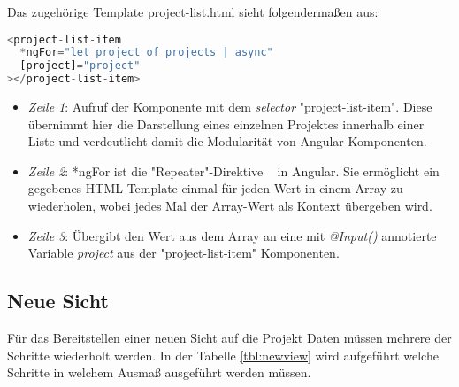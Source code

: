 Das zugehörige Template project-list.html sieht folgendermaßen aus:

\begin{lstlisting}[language=JavaScript,float=h!,caption={Funktion zum Abruf aller Projekte vom Server}, label={lst:example:service}]
<project-list-item
  *ngFor="let project of projects | async"
  [project]="project"
></project-list-item>
\end{lstlisting}

\begin{itemize}
    \setlength\itemsep{-1em}
    \item \emph{Zeile 1}: Aufruf der Komponente mit dem \emph{selector} "project-list-item".
    Diese übernimmt hier die Darstellung eines einzelnen Projektes innerhalb einer Liste und verdeutlicht damit
    die Modularität von Angular Komponenten.
    \item \emph{Zeile 2}: *ngFor ist die "Repeater"-Direktive ~\cite{ng-for} in Angular.
    Sie ermöglicht ein gegebenes HTML Template einmal für jeden Wert in einem Array zu wiederholen,
    wobei jedes Mal der Array-Wert als Kontext übergeben wird.
    \item \emph{Zeile 3}: Übergibt den Wert aus dem Array an eine mit \emph{@Input()} annotierte Variable \emph{project} aus der "project-list-item" Komponenten.
\end{itemize}

\subsection{Neue Sicht}
\label{sec:requirements:example:newview}

Für das Bereitstellen einer neuen Sicht auf die Projekt Daten müssen mehrere der Schritte wiederholt werden.
In der Tabelle \ref{tbl:newview} wird aufgeführt welche Schritte in welchem Ausmaß ausgeführt werden müssen.

